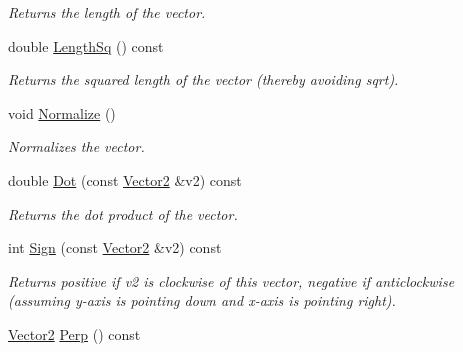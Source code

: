 \begin{DoxyCompactItemize}
\begin{DoxyCompactList}\small\item\em Returns the length of the vector. \end{DoxyCompactList}\item 
\hypertarget{structsteer_1_1_vector2_af8eb7d1603dcf6e474ee65877649db47}{double \hyperlink{structsteer_1_1_vector2_af8eb7d1603dcf6e474ee65877649db47}{Length\-Sq} () const }\label{structsteer_1_1_vector2_af8eb7d1603dcf6e474ee65877649db47}

\begin{DoxyCompactList}\small\item\em Returns the squared length of the vector (thereby avoiding sqrt). \end{DoxyCompactList}\item 
\hypertarget{structsteer_1_1_vector2_a7a18e52012cf852487e3923c5e902739}{void \hyperlink{structsteer_1_1_vector2_a7a18e52012cf852487e3923c5e902739}{Normalize} ()}\label{structsteer_1_1_vector2_a7a18e52012cf852487e3923c5e902739}

\begin{DoxyCompactList}\small\item\em Normalizes the vector. \end{DoxyCompactList}\item 
\hypertarget{structsteer_1_1_vector2_ac2fa511713c43bd4d8a5d7d431acfbb4}{double \hyperlink{structsteer_1_1_vector2_ac2fa511713c43bd4d8a5d7d431acfbb4}{Dot} (const \hyperlink{structsteer_1_1_vector2}{Vector2} \&v2) const }\label{structsteer_1_1_vector2_ac2fa511713c43bd4d8a5d7d431acfbb4}

\begin{DoxyCompactList}\small\item\em Returns the dot product of the vector. \end{DoxyCompactList}\item 
\hypertarget{structsteer_1_1_vector2_a930a20a650638870219deee45b01f94f}{int \hyperlink{structsteer_1_1_vector2_a930a20a650638870219deee45b01f94f}{Sign} (const \hyperlink{structsteer_1_1_vector2}{Vector2} \&v2) const }\label{structsteer_1_1_vector2_a930a20a650638870219deee45b01f94f}

\begin{DoxyCompactList}\small\item\em Returns positive if v2 is clockwise of this vector, negative if anticlockwise (assuming y-\/axis is pointing down and x-\/axis is pointing right). \end{DoxyCompactList}\item 
\hypertarget{structsteer_1_1_vector2_ad2319dbb015ad83c94ed876a5deaf4f2}{\hyperlink{structsteer_1_1_vector2}{Vector2} \hyperlink{structsteer_1_1_vector2_ad2319dbb015ad83c94ed876a5deaf4f2}{Perp} () const }\label{structsteer_1_1_vector2_ad2319dbb015ad83c94ed876a5deaf4f2}


\end{DoxyCompactItemize}
